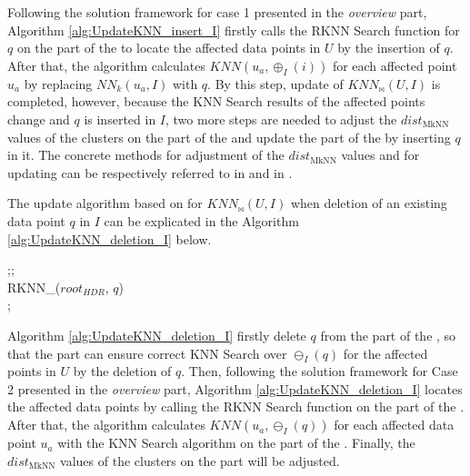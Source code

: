 Following the solution framework for case 1 presented in the \textit{overview} part, Algorithm \ref{alg:UpdateKNN_insert_I} firstly calls the RKNN Search function for $q$ on the \hdrtree part of the \dualtree to locate the affected data points in $U$ by the insertion of $q$. After that, the algorithm calculates $KNN(u_a, \oplus_{I}(i))$ for each affected point $u_a$ by replacing $NN_{k}(u_a,I)$ with $q$. By this step, update of $KNN_{\bowtie}(U,I)$ is completed, however, because the KNN Search results of the affected points change and $q$ is inserted in $I$, two more steps are needed to adjust the $dist_{\text{MkNN}}$ values of the clusters on the \hdrtree part of the \dualtree and update the \deltatree part of the \dualtree by inserting $q$ in it. The concrete methods for adjustment of the $dist_{\text{MkNN}}$ values and for updating \deltatree can be respectively referred to in \cite{yang2014continuous} and in \cite{cui2003contorting}.


The update algorithm based on \dualtree for $KNN_{\bowtie}(U,I)$ when deletion of an existing data point $q$ in $I$ can be explicated in the Algorithm \ref{alg:UpdateKNN_deletion_I} below.

\begin{algorithm}[t]
\caption{KNN$_{\bowtie}$\_Deletion\_I($q$)}\label{alg:UpdateKNN_deletion_I}
;;\\
RKNN\_\dualtree($root_{HDR}$, $q$)\\
{
}   
;\\

\end{algorithm}

Algorithm \ref{alg:UpdateKNN_deletion_I} firstly delete $q$ from the \deltatree part of the \dualtree, so that the \deltatree part can ensure correct KNN Search over $\ominus_{I}(q)$ for the affected points in $U$ by the deletion of $q$. Then, following the solution framework for Case 2 presented in the \textit{overview} part, Algorithm \ref{alg:UpdateKNN_deletion_I} locates the affected data points by calling the RKNN Search function on the \hdrtree part of the \dualtree. After that, the algorithm calculates $KNN(u_a, \ominus_{I}(q))$ for each affected data point $u_a$ with the KNN Search algorithm on the \deltatree part of the \dualtree. Finally, the $dist_{\text{MkNN}}$ values of the clusters on the \hdrtree part will be adjusted.

